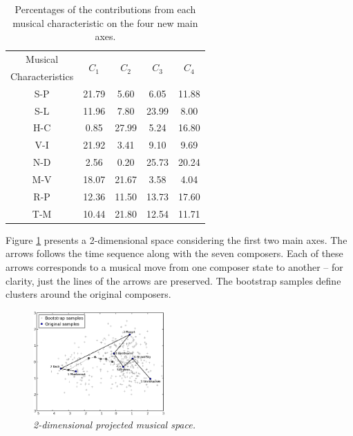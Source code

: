 \documentclass[
 aip,
 jmp,
 amsmath,amssymb,
 reprint,
]{revtex4-1}
\begin{document}
\begin{table}[ht]
\caption{\label{tab:Deviates}Percentages of
the contributions from each musical characteristic on the four
new main axes.}

\begin{tabular}{|c||c|c|c|c|}
\hline
Musical         & \multirow{2}{*}{$C_1$} & \multirow{2}{*}{$C_2$} & \multirow{2}{*}{$C_3$} & \multirow{2}{*}{$C_4$}\\
Characteristics & & & & \\
\hline
 S-P              &  21.79  &   5.60  &  6.05 & 11.88   \\
 S-L              &  11.96  &   7.80  & 23.99 &  8.00  \\
 H-C              &   0.85  &  27.99  &  5.24 & 16.80  \\
 V-I              &  21.92  &   3.41  &  9.10 &  9.69  \\
 N-D              &   2.56  &   0.20  & 25.73 & 20.24  \\
 M-V              &  18.07  &  21.67  &  3.58 &  4.04  \\
 R-P              &  12.36  &  11.50  & 13.73 & 17.60  \\
 T-M              &  10.44  &  21.80  & 12.54 & 11.71  \\
\hline
\end{tabular}
\end{table}

Figure \ref{fig:pca} presents a 2-dimensional space considering the
first two main axes. The arrows follows the time sequence along with the seven
composers. Each of these arrows corresponds to a musical move from one
composer state to another -- for clarity, just the lines of the arrows
are preserved. The bootstrap
samples define clusters around the original
composers.

\begin{figure}[htbp]
  \begin{center}
    \includegraphics[width=0.45\textwidth]{g1}
  \end{center}
  \caption{\it 2-dimensional projected musical space.}
  \label{fig:pca}
\end{figure}
\end{document}
